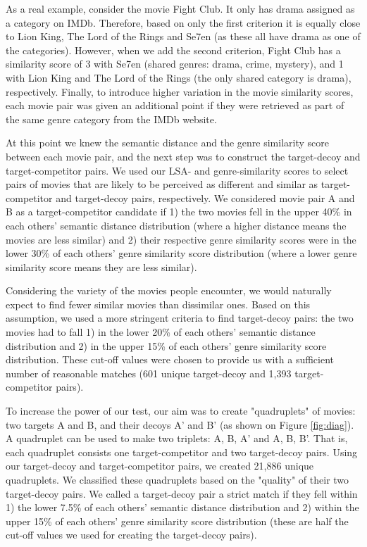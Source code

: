 \documentclass[11pt,a4paper]{article}
\begin{document}
As a real example, consider the movie Fight Club. It only has drama assigned as a category on IMDb. Therefore, based on only the first criterion it is equally close to Lion King,  The Lord of the Rings and Se7en (as these all have drama as one of the categories). However, when we add the second criterion, Fight Club has a similarity score of 3 with Se7en (shared genres: drama, crime, mystery), and 1 with Lion King and The Lord of the Rings (the only shared category is drama), respectively. Finally, to introduce higher variation in the movie similarity scores, each movie pair was given an additional point if they were retrieved as part of the same genre category from the IMDb website.

At this point we knew the semantic distance and the genre similarity score between each movie pair, and the next step was to construct the target-decoy and target-competitor pairs. We used our LSA- and genre-similarity scores to select pairs of movies that are likely to be perceived as different and similar as target-competitor and target-decoy pairs, respectively. We considered movie pair A and B as a target-competitor candidate if 1) the two movies fell in the upper 40\% in each others' semantic distance distribution (where a higher distance means the movies are less similar) and 2) their respective genre similarity scores were in the lower 30\% of each others' genre similarity score distribution (where a lower genre similarity score means they are less similar).

 Considering the variety of the movies people encounter, we would naturally expect to find fewer similar movies than dissimilar ones. Based on this assumption, we used a more stringent criteria to find target-decoy pairs: the two movies had to fall 1) in the lower 20\% of each others' semantic distance distribution and 2) in the upper 15\% of each others' genre similarity score distribution. These cut-off values were chosen to provide us with a sufficient number of reasonable matches (601 unique target-decoy and 1,393 target-competitor pairs).
 
 
To increase the power of our test, our aim was to create "quadruplets" of movies: two targets A and B, and their decoys A' and B' (as shown on Figure \ref{fig:diag}). A quadruplet can be used to make two triplets: A, B, A' and A, B, B'. That is, each quadruplet consists one target-competitor and two target-decoy pairs. Using our target-decoy and target-competitor pairs, we created 21,886 unique quadruplets. We classified these quadruplets based on the "quality" of their two target-decoy pairs. We called a target-decoy pair a strict match if they fell within 1) the lower 7.5\% of each others' semantic distance distribution and 2) within the upper 15\% of each others' genre similarity score distribution (these are half the cut-off values we used for creating the target-decoy pairs). 
\end{document}
